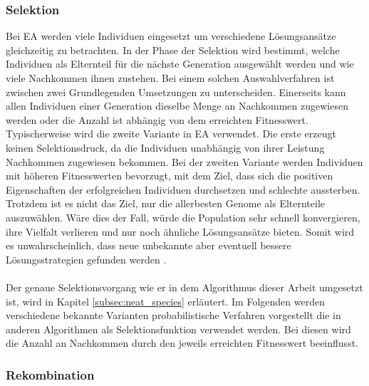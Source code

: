 \subsubsection{Selektion}
Bei \ac{EA} werden viele Individuen eingesetzt um verschiedene Lösungsansätze gleichzeitig zu betrachten. In der Phase der Selektion wird bestimmt, welche Individuen als Elternteil für die nächste Generation ausgewählt werden und wie viele Nachkommen ihnen zustehen. Bei einem solchen Auswahlverfahren ist zwischen zwei Grundlegenden Umsetzungen zu unterscheiden. Einerseits kann allen Individuen einer Generation dieselbe Menge an Nachkommen zugewiesen werden oder die Anzahl ist abhängig von dem erreichten Fitnesswert. Typischerweise wird die zweite Variante in \ac{EA} verwendet. Die erste erzeugt keinen Selektionsdruck, da die Individuen unabhängig von ihrer Leistung Nachkommen zugewiesen bekommen. Bei der zweiten Variante werden Individuen mit höheren Fitnesswerten bevorzugt, mit dem Ziel, dass sich die positiven Eigenschaften der erfolgreichen Individuen durchsetzen und schlechte aussterben. Trotzdem ist es nicht das Ziel, nur die allerbesten Genome als Elternteile auszuwählen. Wäre dies der Fall, würde die Population sehr schnell konvergieren, ihre Vielfalt verlieren und nur noch ähnliche Lösungsansätze bieten. Somit wird es unwahrscheinlich, dass neue unbekannte aber eventuell bessere Lösungsstrategien gefunden werden \cite{weicker2015evolutionare}. 
\\\\
Der genaue Selektionsvorgang wie er in dem Algorithmus dieser Arbeit umgesetzt ist, wird in Kapitel \ref{subsec:neat_species} erläutert. Im Folgenden werden verschiedene bekannte Varianten probabilistische Verfahren vorgestellt die in anderen Algorithmen als Selektionsfunktion verwendet werden. Bei diesen wird die Anzahl an Nachkommen durch den jeweils erreichten Fitnesswert beeinflusst.




\subsubsection{Rekombination}

